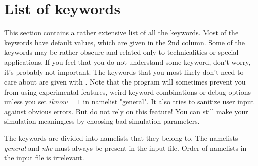 \section{List of keywords}
This section contains a rather extensive list of all the keywords. 
Most of the keywords have default values, which are given in the 2nd column. 
Some of the keywords may be rather obscure and related only to technicalities or special applications.
If you feel that you do not understand some keyword, don't worry, it's probably not important.
The keywords that you most likely don't need to care about are given with .
Note that the program will sometimes prevent you from using experimental features, weird keyword combinations
or debug options unless you set $ iknow=1 $ in namelist "general". It also tries to sanitize user input against obvious errors.
But do not rely on this feature! You can still make your simulation meaningless by choosing bad simulation parameters.

The keywords are divided into namelists that they belong to.
The namelists \textit{general} and \textit{nhc} must always be present in the input file.
Order of namelists in the input file is irrelevant.


